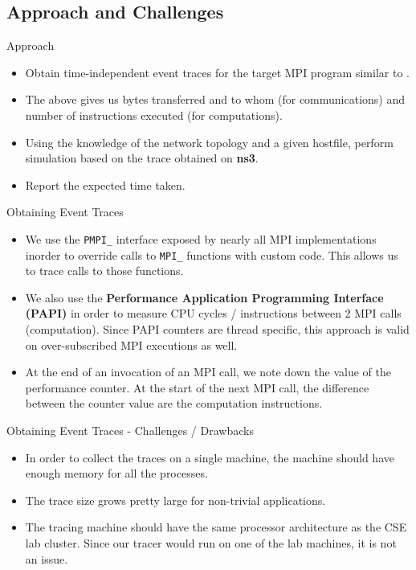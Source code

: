 \documentclass[pdf]{beamer}
\begin{document}
\subsection{Approach and Challenges}
\begin{frame}{Approach}
  \begin{itemize}
    \item<1-> Obtain time-independent event traces for the target MPI program
      similar to \cite{time-independent-trace-sim}.
    \item<2-> The above gives us bytes transferred and to whom (for
      communications) and number of instructions executed (for computations).
    \item<3-> Using the knowledge of the network topology and a given hostfile,
      perform simulation based on the trace obtained on \textbf{ns3}.
    \item<4-> Report the expected time taken.
  \end{itemize}
\end{frame}
\begin{frame}{Obtaining Event Traces}
  \begin{itemize}
    \item<1-> We use the \texttt{PMPI\_} interface exposed by nearly all MPI
      implementations inorder to override calls to \texttt{MPI\_} functions with
      custom code. This allows us to trace calls to those functions.
    \item<2-> We also use the \textbf{Performance Application Programming
        Interface (PAPI)} \cite{papi} in order to measure CPU cycles /
      instructions between 2 MPI calls (computation). Since PAPI counters are
      thread specific, this approach is valid on over-subscribed MPI executions
      as well.
    \item<3-> At the end of an invocation of an MPI call, we note down the value
      of the performance counter. At the start of the next MPI call, the
      difference between the counter value are the computation instructions.
  \end{itemize}
\end{frame}
\begin{frame}{Obtaining Event Traces - Challenges / Drawbacks}
  \begin{itemize}
    \item<1-> In order to collect the traces on a single machine, the machine
      should have enough memory for all the processes.
    \item<2-> The trace size grows pretty large for non-trivial applications.
    \item<3-> The tracing machine should have the same processor architecture
      as the CSE lab cluster. Since our tracer would run on one of the lab
      machines, it is not an issue.
  \end{itemize}
\end{frame}
\end{document}

